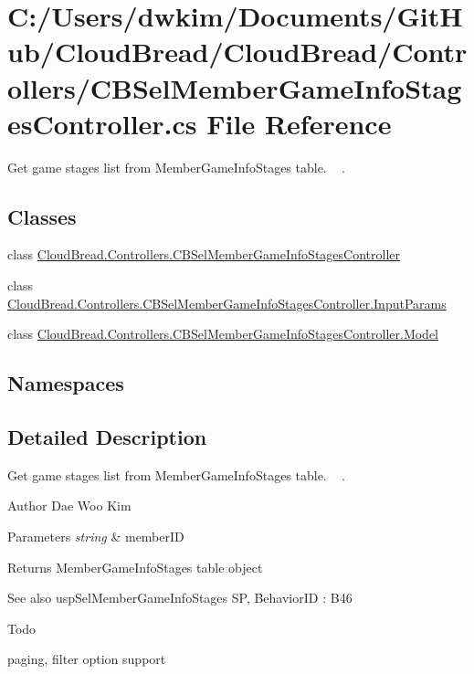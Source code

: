 \hypertarget{a00223}{}\section{C\+:/\+Users/dwkim/\+Documents/\+Git\+Hub/\+Cloud\+Bread/\+Cloud\+Bread/\+Controllers/\+C\+B\+Sel\+Member\+Game\+Info\+Stages\+Controller.cs File Reference}
\label{a00223}


Get game stages list from Member\+Game\+Info\+Stages table. ~\newline
.  


\subsection*{Classes}
\begin{DoxyCompactItemize}
\item 
class \hyperlink{a00052}{Cloud\+Bread.\+Controllers.\+C\+B\+Sel\+Member\+Game\+Info\+Stages\+Controller}
\item 
class \hyperlink{a00096}{Cloud\+Bread.\+Controllers.\+C\+B\+Sel\+Member\+Game\+Info\+Stages\+Controller.\+Input\+Params}
\item 
class \hyperlink{a00154}{Cloud\+Bread.\+Controllers.\+C\+B\+Sel\+Member\+Game\+Info\+Stages\+Controller.\+Model}
\end{DoxyCompactItemize}
\subsection*{Namespaces}
\begin{DoxyCompactItemize}
\end{DoxyCompactItemize}


\subsection{Detailed Description}
Get game stages list from Member\+Game\+Info\+Stages table. ~\newline
. 

\begin{DoxyAuthor}{Author}
Dae Woo Kim 
\end{DoxyAuthor}

\begin{DoxyParams}{Parameters}
{\em string} & member\+ID \\
\hline
\end{DoxyParams}
\begin{DoxyReturn}{Returns}
Member\+Game\+Info\+Stages table object 
\end{DoxyReturn}
\begin{DoxySeeAlso}{See also}
usp\+Sel\+Member\+Game\+Info\+Stages SP, Behavior\+ID \+: B46 
\end{DoxySeeAlso}
\begin{DoxyRefDesc}{Todo}
\item[\hyperlink{a00001__todo000011}{Todo}]paging, filter option support \end{DoxyRefDesc}
